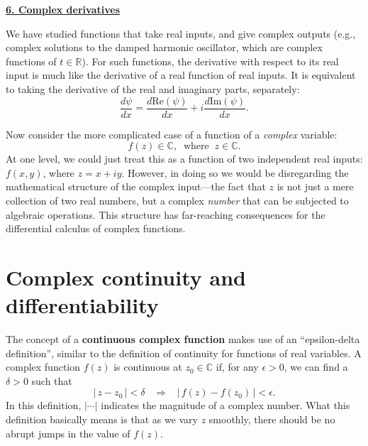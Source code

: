 \documentclass[10pt,a4paper]{article}
\begin{document}
\setcounter{page}{40}
\noindent
\underline{\textbf{\LARGE 6. Complex derivatives}}
\vskip 0.1in

We have studied functions that take real inputs, and give complex
outputs (e.g., complex solutions to the damped harmonic oscillator,
which are complex functions of $t \in \mathbb{R}$). For such
functions, the derivative with respect to its real input is much like
the derivative of a real function of real inputs.  It is equivalent to
taking the derivative of the real and imaginary parts, separately:
\begin{equation}
  \frac{d\psi}{dx}
  = \frac{d\mathrm{Re}(\psi)}{dx} + i \frac{d\mathrm{Im}(\psi)}{dx}.
\end{equation}

Now consider the more complicated case of a function of a
\emph{complex} variable:
\begin{equation}
  f(z) \in \mathbb{C}, \;\;\mathrm{where}\;\; z \in \mathbb{C}.
\end{equation}
At one level, we could just treat this as a function of two
independent real inputs: $f(x,y)$, where $z = x + i y$. However, in
doing so we would be disregarding the mathematical structure of the
complex input---the fact that $z$ is not just a mere collection of two
real numbers, but a complex \emph{number} that can be subjected to
algebraic operations. This structure has far-reaching consequences for
the differential calculus of complex functions.

\section{Complex continuity and differentiability}
\label{complex-continuity-and-differentiability}

The concept of a \textbf{continuous complex function} makes use of an
``epsilon-delta definition'', similar to the definition of continuity
for functions of real variables. A complex function $f(z)$ is
continuous at $z_0 \in \mathbb{C}$ if, for any $\epsilon > 0$, we can
find a $\delta > 0$ such that
\begin{equation}
  \big|\, z - z_0 \,\big| < \delta \;\;\; \Rightarrow
  \;\;\; \big|\, f(z) - f(z_0) \,\big| < \epsilon.
\end{equation}
In this definition, $\big|\cdots\big|$ indicates the magnitude of a
complex number.  What this definition basically means is that as we
vary $z$ smoothly, there should be no abrupt jumps in the value of
$f(z)$.
\end{document}

